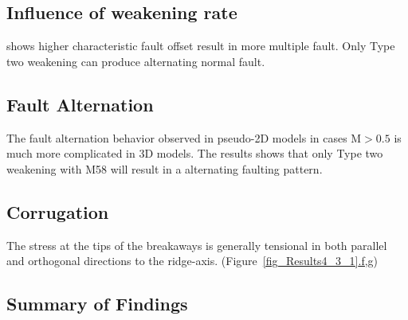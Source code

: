 \subsection{Influence of weakening rate}
\citep{Lavier2000} shows higher characteristic fault offset result in more multiple fault. Only Type two weakening can produce alternating normal fault.
\subsection{Fault Alternation}
The fault alternation behavior observed in pseudo-2D models in cases M$>0.5$ is much more complicated in 3D models. The results shows that only Type two weakening with M58 will result in a alternating faulting pattern. 
\subsection{Corrugation}
The stress at the tips of the breakaways is generally tensional in both parallel and orthogonal directions to the ridge-axis. (Figure~\hyperref[fig_Results4_3_1]{\ref{fig_Results4_3_1}.f,g})
\subsection{Summary of Findings}

